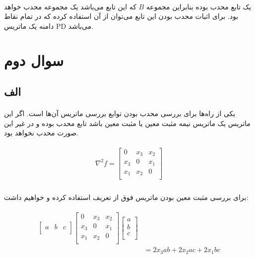 \documentclass[paper=a4, fontsize=11pt]{article}
\numberwithin{equation}{section} %
\numberwithin{figure}{section} %
\numberwithin{table}{section} %
\begin{document}
\paragraph{}
یک تابع محدب بوده بنابراین مجموعه \(B\) که  این تابع می‌باشد یک مجموعه محدب خواهد بود.
برای اثبات محدب بودن این تابع می‌توان از  آن استفاده کرده که در تمام نقاط دامنه
یک ماتریس PD می‌باشد.

\section{سوال دوم}
\subsection{الف}
\paragraph{}
یکی از راه‌ها برای بررسی محدب بودن توابع بررسی ماتریس  آن‌ها است.
اگر این ماتریس یک ماتریس نیمه مثبت معین یا مثبت معین باشد تابع محدب بوده و در غیر این صورت محدب نخواهد بود.

\begin{align}
\begin{split}
	\nabla^2f = \left[\begin{array}{ccc}
		0 & x_3 & x_2 \\
		x_3 & 0 & x_1 \\
		x_1 & x_2 & 0 \\
	\end{array}\right]
\end{split}
\end{align}

\paragraph{}
برای بررسی مثبت معین بودن ماتریس فوق از تعریف استفاده کرده و خواهیم داشت:

\begin{align}
\begin{split}
	\left[\begin{array}{ccc}
		a & b & c \\
	\end{array}\right]
	\left[\begin{array}{ccc}
		0 & x_3 & x_2 \\
		x_3 & 0 & x_1 \\
		x_1 & x_2 & 0 \\
	\end{array}\right]
	\left[\begin{array}{c}
		a \\
		b \\
		c \\
	\end{array}\right]
	\\
	&= 2x_3ab + 2x_2ac + 2x_1bc
\end{split}
\end{align}
\end{document}
